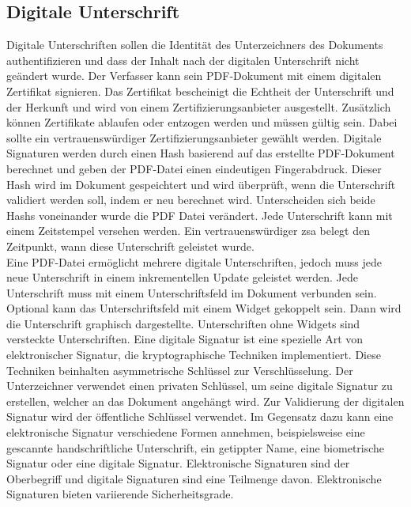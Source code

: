 \subsection{Digitale Unterschrift}
Digitale Unterschriften sollen die Identität des Unterzeichners des Dokuments authentifizieren und dass der Inhalt nach der digitalen Unterschrift nicht geändert wurde. Der Verfasser kann sein PDF-Dokument mit einem digitalen Zertifikat signieren. Das Zertifikat bescheinigt die Echtheit der Unterschrift und der Herkunft und wird von einem Zertifizierungsanbieter ausgestellt. Zusätzlich können Zertifikate ablaufen oder entzogen werden und müssen gültig sein. Dabei sollte ein vertrauenswürdiger Zertifizierungsanbieter gewählt werden. Digitale Signaturen werden durch einen Hash basierend auf das erstellte PDF-Dokument berechnet und geben der PDF-Datei einen eindeutigen Fingerabdruck. Dieser Hash wird im Dokument gespeichtert und wird überprüft, wenn die Unterschrift validiert werden soll, indem er neu berechnet wird. Unterscheiden sich beide Hashs voneinander wurde die PDF Datei verändert. Jede Unterschrift kann mit einem Zeitstempel versehen werden. Ein vertrauenswürdiger \gls{zsa} belegt den Zeitpunkt, wann diese Unterschrift geleistet wurde. \\
Eine PDF-Datei ermöglicht mehrere digitale Unterschriften, jedoch muss jede neue Unterschrift in einem inkrementellen Update geleistet werden. Jede Unterschrift muss mit einem Unterschriftsfeld im Dokument verbunden sein. Optional kann das Unterschriftsfeld mit einem Widget gekoppelt sein. Dann wird die Unterschrift graphisch dargestellte. Unterschriften ohne Widgets sind versteckte Unterschriften. \cite{softx} Eine digitale Signatur ist eine spezielle Art von elektronischer Signatur, die kryptographische Techniken implementiert. Diese Techniken beinhalten asymmetrische Schlüssel zur Verschlüsselung. Der Unterzeichner verwendet einen privaten Schlüssel, um seine digitale Signatur zu erstellen, welcher an das Dokument angehängt wird. Zur Validierung der digitalen Signatur wird der öffentliche Schlüssel verwendet. Im Gegensatz dazu kann eine elektronische Signatur verschiedene Formen annehmen, beispielsweise eine gescannte handschriftliche Unterschrift, ein getippter Name, eine biometrische Signatur oder eine digitale Signatur. Elektronische Signaturen sind der Oberbegriff und digitale Signaturen sind eine Teilmenge davon. Elektronische Signaturen bieten variierende Sicherheitsgrade. \cite{adobe-pdf-pades}

